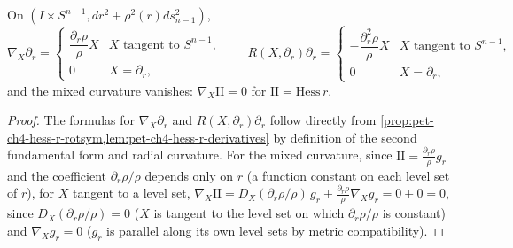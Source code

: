 \begin{proposition}
  \label{prop:pet-ch4-rotsym-radial-jacobi}
  On $(I\times S^{n-1},dr^2+\rho^2(r)ds_{n-1}^2)$,
  \[
    \nabla_X\partial_r=\begin{cases}\dfrac{\partial_r\rho}{\rho}X&X\text{ tangent to }S^{n-1},\\[4pt]0&X=\partial_r,\end{cases}
    \qquad
    R(X,\partial_r)\partial_r=\begin{cases}-\dfrac{\partial_r^2\rho}{\rho}X&X\text{ tangent to }S^{n-1},\\[4pt]0&X=\partial_r,\end{cases}
  \]
  and the mixed curvature vanishes: $\nabla_X\mathrm{II}=0$ for $\mathrm{II}=\mathrm{Hess}\,r$.
\end{proposition}
\begin{proof}
  The formulas for $\nabla_X\partial_r$ and $R(X,\partial_r)\partial_r$ follow directly
  from \cref{prop:pet-ch4-hess-r-rotsym,lem:pet-ch4-hess-r-derivatives} by
  definition of the second fundamental form and radial curvature. For the mixed
  curvature, since $\mathrm{II}=\tfrac{\partial_r\rho}{\rho}g_r$ and the coefficient
  $\partial_r\rho/\rho$ depends only on $r$ (a function constant on each level set
  of $r$), for $X$ tangent to a level set,
  $\nabla_X\mathrm{II}=D_X(\partial_r\rho/\rho)\,g_r+\tfrac{\partial_r\rho}{\rho}\nabla_Xg_r=0+0=0$,
  since $D_X(\partial_r\rho/\rho)=0$ ($X$ is tangent to the level set on which
  $\partial_r\rho/\rho$ is constant) and $\nabla_Xg_r=0$ ($g_r$ is parallel along its
  own level sets by metric compatibility).
\end{proof}

